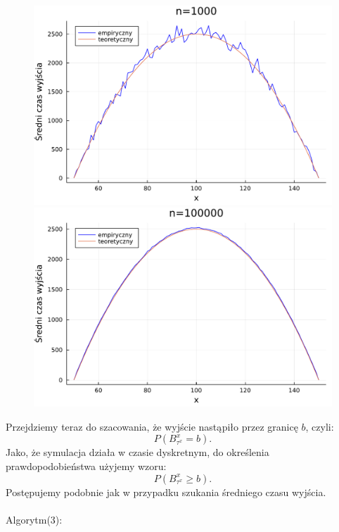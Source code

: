 \documentclass{article}
\theoremstyle{break}
\begin{document}
\begin{figure}[H]
	\begin{multicols}{2}
		\begin{center}
			\includegraphics[scale=0.30]{time100poly.pdf}
			\caption{}
			\label{fig:3}
			\includegraphics[scale=0.30]{time100000poly.pdf}
			\caption{}
			\label{fig:4}
		\end{center}
	\end{multicols}
\end{figure}
Przejdziemy teraz do szacowania, że wyjście nastąpiło przez granicę $b$, czyli:
$$P(B_{\tau^x}^x=b).$$
Jako, że symulacja działa w czasie dyskretnym, do określenia prawdopodobieństwa użyjemy wzoru:
$$P(B_{\tau^x}^x\geq b).$$
Postępujemy podobnie jak w przypadku szukania średniego czasu wyjścia.\\ \\
Algorytm(3):
\end{document}
